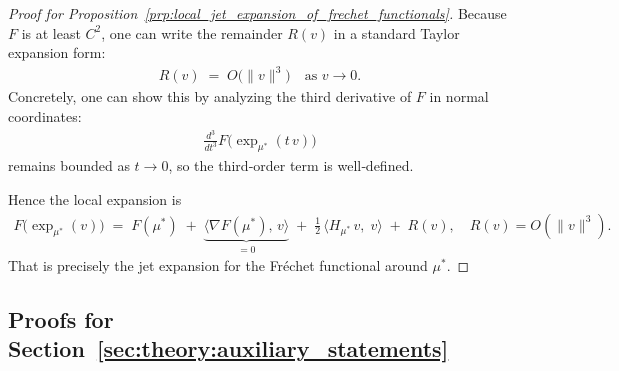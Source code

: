 \begin{proof}[Proof for Proposition~\ref{prp:local_jet_expansion_of_frechet_functionals}]
    Because \(F\) is at least \(C^2\), one can write the remainder \(R(v)\) in a standard Taylor expansion form:
    \begin{align*}
        R(v)
       \;=\;
       O\bigl(\|v\|^3\bigr)
       \quad\text{as }v\to 0.
    \end{align*}
    Concretely, one can show this by analyzing the third derivative of \(F\) in normal coordinates:  
    \begin{align*}
        \frac{d^3}{dt^3}F\bigl(\exp_{\mu^*}(t\,v)\bigr)
    \end{align*}
    remains bounded as \(t\to0\), so the third‐order term is well‐defined.
    
    Hence the local expansion is
    \begin{align*}
        F\bigl(\exp_{\mu^*}(v)\bigr)
        \;=\;
        F(\mu^*)
        \;+\;
        \underbrace{\bigl\langle\nabla F(\mu^*),\,v\bigr\rangle}_{=0}
        \;+\;
        \tfrac12\,\bigl\langle H_{\mu^*}\,v,\;v\bigr\rangle
        \;+\;
        R(v),
        \quad
        R(v)=O(\|v\|^3).
    \end{align*}
    That is precisely the jet expansion for the Fréchet functional around \(\mu^*\).
\end{proof}

\subsection{Proofs for Section~\ref{sec:theory:auxiliary_statements}}

